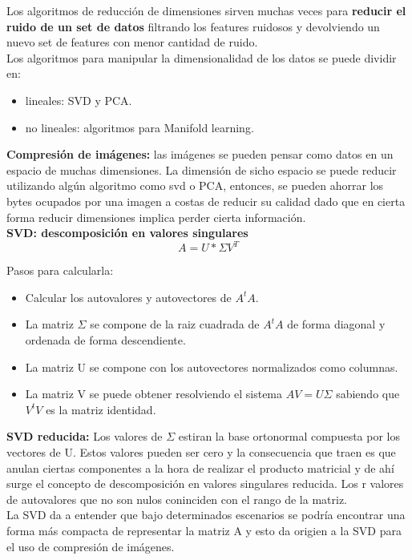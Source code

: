\documentclass[titlepage,a4paper]{article}
\begin{document}
Los algoritmos de reducción de dimensiones sirven muchas veces para \textbf{reducir el ruido de un set de datos} filtrando los features ruidosos y devolviendo un nuevo set de features con menor cantidad de ruido. \\

Los algoritmos para manipular la dimensionalidad de los datos se puede dividir en: 
\begin{itemize}
\item lineales: SVD y PCA. 
\item no lineales: algoritmos para Manifold learning. 
\end{itemize}

\textbf{Compresión de imágenes:} las imágenes se pueden pensar como datos en un espacio de muchas dimensiones. La dimensión de sicho espacio se puede reducir utilizando algún algoritmo como svd o PCA, entonces, se pueden ahorrar los bytes ocupados por una imagen a costas de reducir su calidad dado que en cierta forma reducir dimensiones implica perder cierta información. \\

\textbf{SVD: descomposición en valores singulares}\\

$$ A = U*\Sigma V^T$$

Pasos para calcularla:
\begin{itemize}
\item Calcular los autovalores y autovectores de $A^tA$. 
\item La matriz $\Sigma$ se compone de la raiz cuadrada de $A^tA$ de forma diagonal y ordenada de forma descendiente. 
\item La matriz U se compone con los autovectores normalizados como columnas. 
\item La matriz V se puede obtener resolviendo el sistema $AV = U\Sigma$ sabiendo que $V^tV$ es la matriz identidad. 
\end{itemize}

\textbf{SVD reducida:} Los valores de $\Sigma$ estiran la base ortonormal compuesta por los vectores de U.  Estos valores pueden ser cero y la consecuencia que traen es que anulan ciertas componentes a la hora de realizar el producto matricial y de ahí surge el concepto de descomposición en valores singulares reducida.  Los r valores de autovalores que no son nulos coninciden con el rango de la matriz.\\

La SVD da a entender que bajo determinados escenarios se podría encontrar una forma más compacta de representar la matriz A y esto da origien a la SVD para el uso de compresión de imágenes. \\
\end{document}
